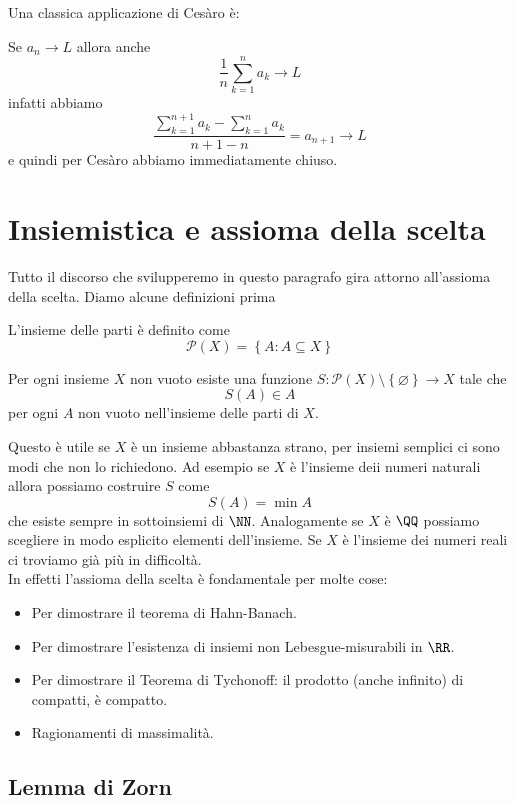 \documentclass[11pt]{scrartcl}
\newcommand{\eset}{\varnothing}
\newcommand{\parti}{\mathcal{P}}
\begin{document}
  Una classica applicazione di Cesàro è:
  \begin{example}
  	Se $a_n\to L$ allora anche
  	$$\frac{1}{n}\sum_{k=1}^n a_k\to L$$
  	infatti abbiamo
  	$$\frac{\sum_{k=1}^{n+1}a_k-\sum_{k=1}^n a_k}{n+1-n}=a_{n+1}\to L$$
  	e quindi per Cesàro abbiamo immediatamente chiuso.
  \end{example}
  
  \newpage
  
  \section{Insiemistica e assioma della scelta}
  
  Tutto il discorso che svilupperemo in questo paragrafo gira attorno all'assioma della scelta. Diamo alcune definizioni prima
  \begin{definition}
  	L'insieme delle parti è definito come
  	$$\parti(X)=\left\{A:A\subseteq X\right\}$$
  \end{definition}
  \begin{proposition}
  	Per ogni insieme $X$ non vuoto esiste una funzione $S:\parti(X)\setminus\left\{\eset\right\}\to X$ tale che
  	$$S(A)\in A$$ 
  	per ogni $A$ non vuoto nell'insieme delle parti di $X$.
  \end{proposition}
  Questo è utile se $X$ è un insieme abbastanza strano, per insiemi semplici ci sono modi che non lo richiedono. Ad esempio se $X$ è l'insieme deii numeri naturali allora possiamo costruire $S$ come
  $$S(A)=\min A$$
  che esiste sempre in sottoinsiemi di $\NN$. Analogamente se $X$ è $\QQ$ possiamo scegliere in modo esplicito elementi dell'insieme. Se $X$ è l'insieme dei numeri reali ci troviamo già più in difficoltà. \\
  In effetti l'assioma della scelta è fondamentale per molte cose:
  \begin{itemize}
  	\item Per dimostrare il teorema di Hahn-Banach.
  	\item Per dimostrare l'esistenza di insiemi non Lebesgue-misurabili in $\RR$.
  	\item Per dimostrare il Teorema di Tychonoff: il prodotto (anche infinito) di compatti, è compatto.
  	\item Ragionamenti di massimalità.
  \end{itemize}
  \subsection{Lemma di Zorn}
  
\end{document}
